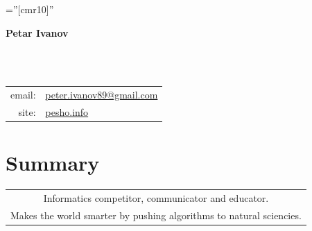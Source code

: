 \documentclass[a4paper,10pt]{article}
\def\name{Petar Ivanov}
\newcommand{\minorcolor}[1]{\textcolor{mygray}{#1}}
\begin{document}
\pagestyle{empty}				%
\font\fb=''[cmr10]''				%

\begin{figure}
	\setlength\fboxsep{0pt}
	\setlength\fboxrule{0.1pt}
        \vspace{-50pt}
\end{figure}

\par{\raggedright\Huge\textbf{\vspace{-3mm}\hspace{0mm}\name}}\\		%
\vspace{-5mm}{\color{linegray}\rule{10.5cm}{0.1mm}}\\

\hspace{4mm}\begin{tabular}{rl}
	\minorcolor{email:} & \href{mailto:peter.ivanov89@gmail.com}{peter.ivanov89@gmail.com}\\
	\minorcolor{site:} & \href{http://pesho.info}{pesho.info}\\
\end{tabular}
\bigskip

\section{Summary}
\begin{center}
  \begin{tabular}{c}
    Informatics competitor, communicator and educator.\\
    Makes the world smarter by pushing algorithms to natural sciencies.
    \end{tabular}
\end{center}
\end{document}
